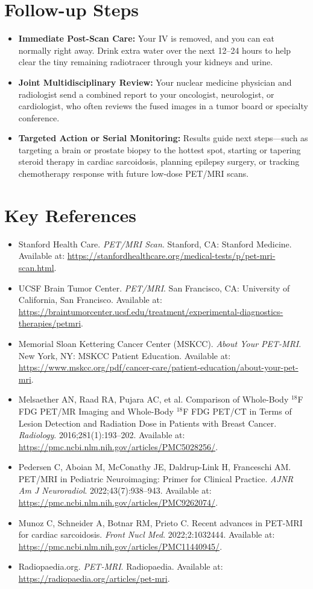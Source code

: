 \section{Follow-up Steps}
\begin{itemize}
\item \textbf{Immediate Post-Scan Care:} Your IV is removed, and you can eat normally right away. Drink extra water over the next 12--24 hours to help clear the tiny remaining radiotracer through your kidneys and urine.
\item \textbf{Joint Multidisciplinary Review:} Your nuclear medicine physician and radiologist send a combined report to your oncologist, neurologist, or cardiologist, who often reviews the fused images in a tumor board or specialty conference.
\item \textbf{Targeted Action or Serial Monitoring:} Results guide next steps---such as targeting a brain or prostate biopsy to the hottest spot, starting or tapering steroid therapy in cardiac sarcoidosis, planning epilepsy surgery, or tracking chemotherapy response with future low-dose PET/MRI scans.
\end{itemize}

\section{Key References}
\begin{itemize}
\item Stanford Health Care. \textit{PET/MRI Scan}. Stanford, CA: Stanford Medicine. Available at: \url{https://stanfordhealthcare.org/medical-tests/p/pet-mri-scan.html}.
\item UCSF Brain Tumor Center. \textit{PET/MRI}. San Francisco, CA: University of California, San Francisco. Available at: \url{https://braintumorcenter.ucsf.edu/treatment/experimental-diagnostics-therapies/petmri}.
\item Memorial Sloan Kettering Cancer Center (MSKCC). \textit{About Your PET-MRI}. New York, NY: MSKCC Patient Education. Available at: \url{https://www.mskcc.org/pdf/cancer-care/patient-education/about-your-pet-mri}.
\item Melsaether AN, Raad RA, Pujara AC, et al. Comparison of Whole-Body $^{18}$F FDG PET/MR Imaging and Whole-Body $^{18}$F FDG PET/CT in Terms of Lesion Detection and Radiation Dose in Patients with Breast Cancer. \textit{Radiology}. 2016;281(1):193--202. Available at: \url{https://pmc.ncbi.nlm.nih.gov/articles/PMC5028256/}.
\item Pedersen C, Aboian M, McConathy JE, Daldrup-Link H, Franceschi AM. PET/MRI in Pediatric Neuroimaging: Primer for Clinical Practice. \textit{AJNR Am J Neuroradiol}. 2022;43(7):938--943. Available at: \url{https://pmc.ncbi.nlm.nih.gov/articles/PMC9262074/}.
\item Munoz C, Schneider A, Botnar RM, Prieto C. Recent advances in PET-MRI for cardiac sarcoidosis. \textit{Front Nucl Med}. 2022;2:1032444. Available at: \url{https://pmc.ncbi.nlm.nih.gov/articles/PMC11440945/}.
\item Radiopaedia.org. \textit{PET-MRI}. Radiopaedia. Available at: \url{https://radiopaedia.org/articles/pet-mri}.
\end{itemize}

